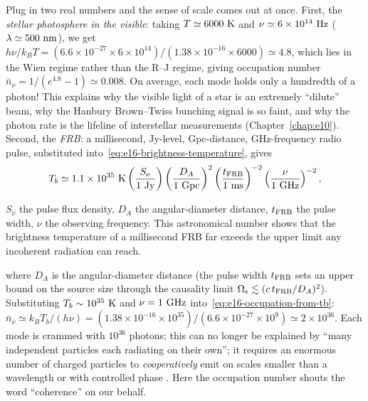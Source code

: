 Plug in two real numbers and the sense of scale comes out at once. First, the \emph{stellar photosphere in the visible}: taking \(T\simeq6000~{\rm K}\) and \(\nu\simeq6\times10^{14}~{\rm Hz}\) (\(\lambda\simeq500~{\rm nm}\)), we get \(h\nu/k_BT=(6.6\times10^{-27}\times6\times10^{14})/(1.38\times10^{-16}\times6000)\simeq4.8\), which lies in the Wien regime rather than the R--J regime, giving occupation number \(\bar n_\nu=1/(e^{4.8}-1)\simeq0.008\). On average, each mode holds only a hundredth of a photon! This explains why the visible light of a star is an extremely ``dilute'' beam, why the Hanbury Brown--Twiss bunching signal is so faint, and why the photon rate is the lifeline of interstellar measurements (Chapter~\ref{chap:e10}). Second, the \emph{FRB}: a millisecond, Jy-level, Gpc-distance, GHz-frequency radio pulse, substituted into~\eqref{eq:e16-brightness-temperature}, gives
\begin{equation}
  T_b\simeq
  1.1\times10^{35}~{\rm K}
  \left(\frac{S_\nu}{1~{\rm Jy}}\right)
  \left(\frac{D_A}{1~{\rm Gpc}}\right)^2
  \left(\frac{t_{\rm FRB}}{1~{\rm ms}}\right)^{-2}
  \left(\frac{\nu}{1~{\rm GHz}}\right)^{-2},
  \label{eq:e16-frb-tb}
\end{equation}
\begin{formulaexplain}
\(S_\nu\) the pulse flux density, \(D_A\) the angular-diameter distance, \(t_{\rm FRB}\) the pulse width, \(\nu\) the observing frequency. This astronomical number shows that the brightness temperature of a millisecond FRB far exceeds the upper limit any incoherent radiation can reach.
\end{formulaexplain}
where \(D_A\) is the angular-diameter distance (the pulse width \(t_{\rm FRB}\) sets an upper bound on the source size through the causality limit \(\Omega_{\rm s}\lesssim(c\,t_{\rm FRB}/D_A)^2\)). Substituting \(T_b\sim10^{35}~{\rm K}\) and \(\nu=1~{\rm GHz}\) into~\eqref{eq:e16-occupation-from-tb}: \(\bar n_\nu\simeq k_BT_b/(h\nu)=(1.38\times10^{-16}\times10^{35})/(6.6\times10^{-27}\times10^{9})\simeq2\times10^{36}\). Each mode is crammed with \(10^{36}\) photons; this can no longer be explained by ``many independent particles each radiating on their own''; it requires an enormous number of charged particles to \emph{cooperatively} emit on scales smaller than a wavelength or with controlled phase \citep{2007Sci...318..777L,2019A&ARv..27....4P,2022A&ARv..30....2P}. Here the occupation number shouts the word ``coherence'' on our behalf.

